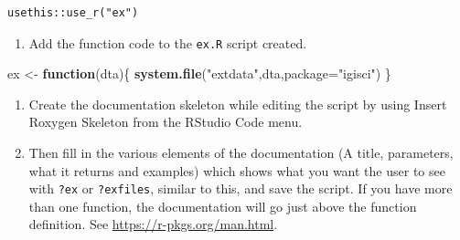 \documentclass[
]{book}
\newenvironment{Shaded}{\begin{snugshade}}{\end{snugshade}}
\newcommand{\AttributeTok}[1]{\textcolor[rgb]{0.27,0.27,0.27}{#1}}
\newcommand{\ControlFlowTok}[1]{\textcolor[rgb]{0.27,0.27,0.27}{\textbf{#1}}}
\newcommand{\FunctionTok}[1]{\textcolor[rgb]{0.27,0.27,0.27}{\textbf{#1}}}
\newcommand{\NormalTok}[1]{#1}
\newcommand{\OtherTok}[1]{\textcolor[rgb]{0.37,0.37,0.37}{#1}}
\newcommand{\StringTok}[1]{\textcolor[rgb]{0.5,0.5,0.5}{#1}}
\providecommand{\tightlist}{%
  \setlength{\itemsep}{0pt}\setlength{\parskip}{0pt}}
\begin{document}
\begin{verbatim}
usethis::use_r("ex")
\end{verbatim}

\begin{enumerate}
\def\labelenumi{\arabic{enumi}.}
\setcounter{enumi}{1}
\tightlist
\item
  Add the function code to the \texttt{ex.R} script created.
\end{enumerate}

\begin{Shaded}
\begin{Highlighting}[]
\NormalTok{ex }\OtherTok{\textless{}{-}} \ControlFlowTok{function}\NormalTok{(dta)\{}
  \FunctionTok{system.file}\NormalTok{(}\StringTok{"extdata"}\NormalTok{,dta,}\AttributeTok{package=}\StringTok{"igisci"}\NormalTok{)}
\NormalTok{  \}}
\end{Highlighting}
\end{Shaded}

\begin{enumerate}
\def\labelenumi{\arabic{enumi}.}
\setcounter{enumi}{2}
\item
  Create the documentation skeleton while editing the script by using Insert Roxygen Skeleton from the RStudio Code menu.
\item
  Then fill in the various elements of the documentation (A title, parameters, what it returns and examples) which shows what you want the user to see with \texttt{?ex} or \texttt{?exfiles}, similar to this, and save the script. If you have more than one function, the documentation will go just above the function definition. See \url{https://r-pkgs.org/man.html}.
\end{enumerate}
\end{document}
